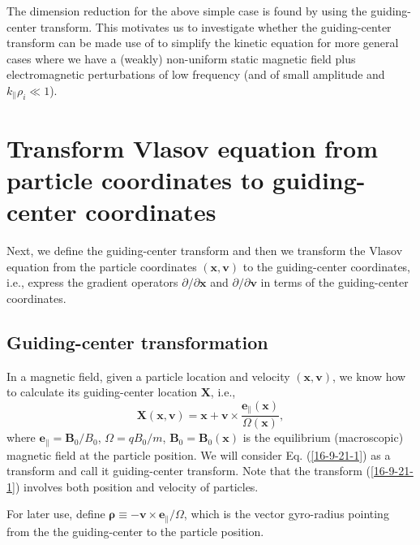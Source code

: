 \documentclass{llncs}
\newcommand{\tmmathbf}[1]{\ensuremath{\boldsymbol{#1}}}
\begin{document}
The dimension reduction for the above simple case is found by using the
guiding-center transform. This motivates us to investigate whether the
guiding-center transform can be made use of to simplify the kinetic equation
for more general cases where we have a (weakly) non-uniform static magnetic
field plus electromagnetic perturbations of low frequency (and of small
amplitude and $k_{\parallel} \rho_i \ll 1$).

\section{Transform Vlasov equation from particle coordinates to guiding-center
coordinates}

Next, we define the guiding-center transform and then we transform the Vlasov
equation from the particle coordinates $(\mathbf{x}, \mathbf{v})$ to the
guiding-center coordinates, i.e., express the gradient operators $\partial /
\partial \mathbf{x}$ and $\partial / \partial \mathbf{v}$ in terms of the
guiding-center coordinates.

\subsection{Guiding-center transformation}

In a magnetic field, given a particle location and velocity $(\mathbf{x},
\mathbf{v})$, we know how to calculate its guiding-center location
$\mathbf{X}$, i.e.,
\begin{equation}
  \label{16-9-21-1} \mathbf{X} (\mathbf{x}, \mathbf{v}) =\mathbf{x}+\mathbf{v}
  \times \frac{\tmmathbf{e}_{\parallel} (\mathbf{x})}{\Omega (\mathbf{x})},
\end{equation}
where $\tmmathbf{e}_{\parallel} =\mathbf{B}_0 / B_0$, $\Omega = q B_0 / m$,
$\mathbf{B}_0 =\mathbf{B}_0 (\mathbf{x})$ is the equilibrium (macroscopic)
magnetic field at the particle position. We will consider Eq.
(\ref{16-9-21-1}) as a transform and call it guiding-center
transform{\cite{Catto1978}}. Note that the transform (\ref{16-9-21-1})
involves both position and velocity of particles.

For later use, define $\tmmathbf{\rho} \equiv -\mathbf{v} \times
\mathbf{e}_{\parallel} / \Omega$, which is the vector gyro-radius pointing
from the the guiding-center to the particle position.
\end{document}
